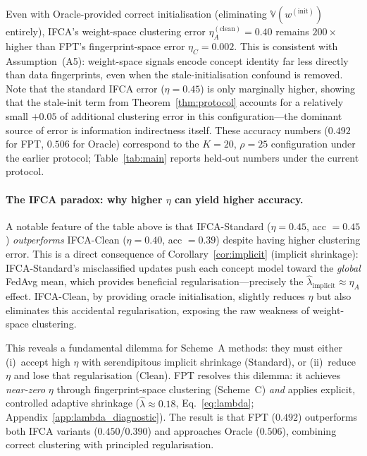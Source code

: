 \documentclass[11pt]{article}
\newcommand{\V}{\mathbb{V}}
\begin{document}
\noindent Even with Oracle-provided correct initialisation (eliminating $\V(w^{(\mathrm{init})})$ entirely), IFCA's weight-space clustering error $\eta_A^{(\mathrm{clean})} = 0.40$ remains $200\times$ higher than FPT's fingerprint-space error $\eta_C = 0.002$.
This is consistent with Assumption~(A5): weight-space signals encode concept identity far less directly than data fingerprints, even when the stale-initialisation confound is removed.
Note that the standard IFCA error ($\eta = 0.45$) is only marginally higher, showing that the stale-init term from Theorem~\ref{thm:protocol} accounts for a relatively small $+0.05$ of additional clustering error in this configuration---the dominant source of error is information indirectness itself.
These accuracy numbers ($0.492$ for FPT, $0.506$ for Oracle) correspond to the $K{=}20$, $\rho{=}25$ configuration under the earlier protocol; Table~\ref{tab:main} reports held-out numbers under the current protocol.

\paragraph{The IFCA paradox: why higher $\eta$ can yield higher accuracy.}
A notable feature of the table above is that IFCA-Standard ($\eta = 0.45$, acc $= 0.45$) \emph{outperforms} IFCA-Clean ($\eta = 0.40$, acc $= 0.39$) despite having higher clustering error.
This is a direct consequence of Corollary~\ref{cor:implicit} (implicit shrinkage): IFCA-Standard's misclassified updates push each concept model toward the \emph{global} FedAvg mean, which provides beneficial regularisation---precisely the $\hat\lambda_{\mathrm{implicit}} \approx \eta_A$ effect.
IFCA-Clean, by providing oracle initialisation, slightly reduces $\eta$ but also eliminates this accidental regularisation, exposing the raw weakness of weight-space clustering.

This reveals a fundamental dilemma for Scheme~A methods: they must either (i)~accept high $\eta$ with serendipitous implicit shrinkage (Standard), or (ii)~reduce $\eta$ and lose that regularisation (Clean).
FPT resolves this dilemma: it achieves \emph{near-zero} $\eta$ through fingerprint-space clustering (Scheme~C) \emph{and} applies explicit, controlled adaptive shrinkage ($\hat\lambda \approx 0.18$, Eq.~\ref{eq:lambda}; Appendix~\ref{app:lambda_diagnostic}).
The result is that FPT ($0.492$) outperforms both IFCA variants ($0.450$/$0.390$) and approaches Oracle ($0.506$), combining correct clustering with principled regularisation.
\end{document}

